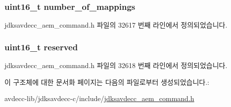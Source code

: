 \subsubsection[{\texorpdfstring{number\+\_\+of\+\_\+mappings}{number_of_mappings}}]{\setlength{\rightskip}{0pt plus 5cm}uint16\+\_\+t number\+\_\+of\+\_\+mappings}\hypertarget{structjdksavdecc__aem__command__add__sensor__mappings__response_ac7db472c5622ef473d5d0a5c416d5531}{}\label{structjdksavdecc__aem__command__add__sensor__mappings__response_ac7db472c5622ef473d5d0a5c416d5531}


jdksavdecc\+\_\+aem\+\_\+command.\+h 파일의 32617 번째 라인에서 정의되었습니다.

\subsubsection[{\texorpdfstring{reserved}{reserved}}]{\setlength{\rightskip}{0pt plus 5cm}uint16\+\_\+t reserved}\hypertarget{structjdksavdecc__aem__command__add__sensor__mappings__response_a5a6ed8c04a3db86066924b1a1bf4dad3}{}\label{structjdksavdecc__aem__command__add__sensor__mappings__response_a5a6ed8c04a3db86066924b1a1bf4dad3}


jdksavdecc\+\_\+aem\+\_\+command.\+h 파일의 32618 번째 라인에서 정의되었습니다.



이 구조체에 대한 문서화 페이지는 다음의 파일로부터 생성되었습니다.\+:\begin{DoxyCompactItemize}
\item 
avdecc-\/lib/jdksavdecc-\/c/include/\hyperlink{jdksavdecc__aem__command_8h}{jdksavdecc\+\_\+aem\+\_\+command.\+h}\end{DoxyCompactItemize}
